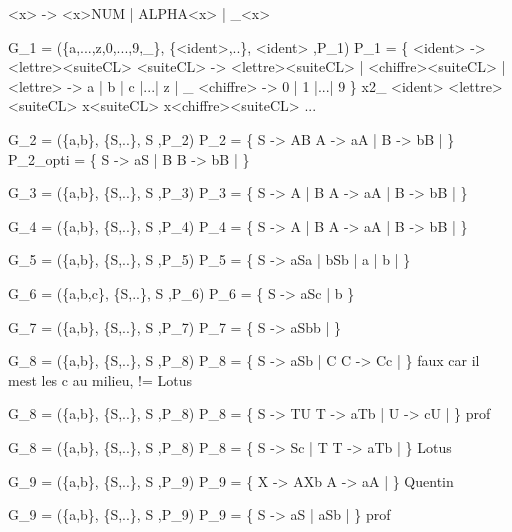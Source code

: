 <x> -> <x>NUM | ALPHA<x> | _<x>

G_1 = (\{a,...,z,0,...,9,_\}, \{<ident>,..\}, <ident> ,P_1)
P_1 = \{
	<ident> -> <lettre><suiteCL>
	<suiteCL> -> <lettre><suiteCL> | <chiffre><suiteCL> | \varepsilon
	<lettre> -> a | b | c |...| z | _
	<chiffre> -> 0 | 1 |...| 9 
\}
x2_ <ident> \rightarrow <lettre><suiteCL> \rightarrow x<suiteCL> \rightarrow x<chiffre><suiteCL> \rightarrow...

G_2 = (\{a,b\}, \{S,..\}, S ,P_2)
P_2 = \{
	S -> AB
	A -> aA | \varepsilon
	B -> bB | \varepsilon
\}
P_2_opti = \{
	S -> aS | B
	B -> bB | \varepsilon
\}

G_3 = (\{a,b\}, \{S,..\}, S ,P_3)
P_3 = \{
	S -> A | B
	A -> aA | \varepsilon
	B -> bB | \varepsilon
\}

G_4 = (\{a,b\}, \{S,..\}, S ,P_4)
P_4 = \{
	S -> A | B
	A -> aA | \varepsilon
	B -> bB | \varepsilon
\}

G_5 = (\{a,b\}, \{S,..\}, S ,P_5)
P_5 = \{
	S -> aSa | bSb | a | b | \varepsilon
\}


G_6 = (\{a,b,c\}, \{S,..\}, S ,P_6)
P_6 = \{
	S -> aSc | b
\}

G_7 = (\{a,b\}, \{S,..\}, S ,P_7)
P_7 = \{
	S -> aSbb | \varepsilon
\}

G_8 = (\{a,b\}, \{S,..\}, S ,P_8)
P_8 = \{
	S -> aSb | C
	C -> Cc  | \varepsilon
\} faux car il mest les c au milieu, != Lotus

G_8 = (\{a,b\}, \{S,..\}, S ,P_8)
P_8 = \{
	S -> TU
	T -> aTb  | \varepsilon
	U -> cU  | \varepsilon
\} prof

G_8 = (\{a,b\}, \{S,..\}, S ,P_8)
P_8 = \{
	S -> Sc | T
	T -> aTb  | \varepsilon
\} Lotus

G_9 = (\{a,b\}, \{S,..\}, S ,P_9)
P_9 = \{
	X -> AXb
	A -> aA | \varepsilon
\} Quentin

G_9 = (\{a,b\}, \{S,..\}, S ,P_9)
P_9 = \{
	S -> aS | aSb | \varepsilon
\} prof